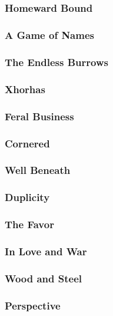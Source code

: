     \newpage
    \subsection{} \vspace*{\fill}
    \newpage
        \subsubsection{Homeward Bound}
        \subsubsection{A Game of Names}
        \subsubsection{The Endless Burrows}
        \subsubsection{Xhorhas}
        \subsubsection{Feral Business}
        \subsubsection{Cornered}
        \subsubsection{Well Beneath}
        \subsubsection{Duplicity}
        \subsubsection{The Favor}
        \subsubsection{In Love and War}
        \subsubsection{Wood and Steel}
        \subsubsection{Perspective}
